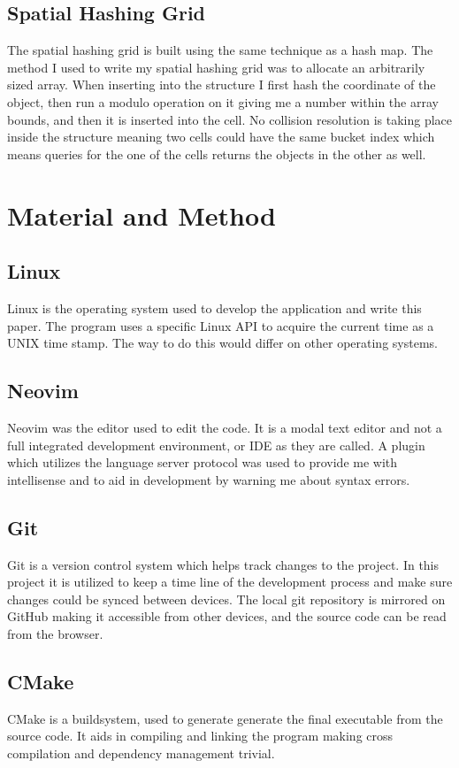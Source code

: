 \documentclass[a4paper, 12pt]{article}
\begin{document}
\subsection{Spatial Hashing Grid}
The spatial hashing grid is built using the same technique as a hash map. The
method I used to write my spatial hashing grid was to allocate an arbitrarily
sized array. When inserting into the structure I first hash the coordinate of
the object, then run a modulo operation on it giving me a number within the
array bounds, and then it is inserted into the cell. No collision resolution is
taking place inside the structure meaning two cells could have the same bucket
index which means queries for the one of the cells returns the objects in the
other as well.

\section{Material and Method}

\subsection{Linux}
Linux is the operating system used to develop the application and write this
paper. The program uses a specific Linux API to acquire the current time as a
UNIX time stamp. The way to do this would differ on other operating systems.

\subsection{Neovim}
Neovim was the editor used to edit the code. It is a modal text editor and not a
full integrated development environment, or IDE as they are called. A plugin
which utilizes the language server protocol was used to provide me with
intellisense and to aid in development by warning me about syntax errors.

\subsection{Git}
Git is a version control system which helps track changes to the project. In
this project it is utilized to keep a time line of the development process and
make sure changes could be synced between devices. The local git repository is
mirrored on GitHub making it accessible from other devices, and the source code
can be read from the browser.

\subsection{CMake}
CMake is a buildsystem, used to generate generate the final executable from the
source code. It aids in compiling and linking the program making cross
compilation and dependency management trivial.
\end{document}
